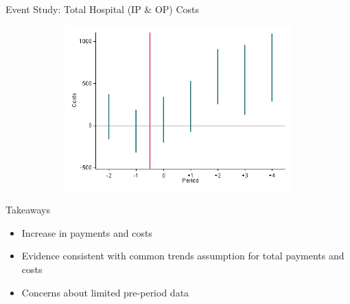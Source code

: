 \documentclass[t,aspectratio=169]{beamer}
\begin{document}
\begin{frame}{Event Study: Total Hospital (IP \& OP) Costs}
    \begin{figure}
        \centering
        \includegraphics[height=2.5in,width=5in,keepaspectratio]{EventCharge_All_2011}
    \end{figure}
\end{frame}

\begin{frame}{Takeaways}
    \begin{itemize}
        \item Increase in payments and costs
        \item Evidence consistent with common trends assumption for total payments and costs
        \item Concerns about limited pre-period data
    \end{itemize}
\end{frame}
\end{document}
